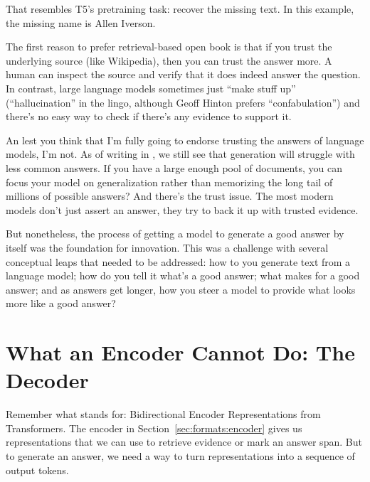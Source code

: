 That resembles T5's pretraining task: recover the missing text.  In this example, the missing name is Allen Iverson.

The first reason to prefer retrieval-based open book  is that if you trust the underlying source (like Wikipedia), then you can trust the answer more.  A human can inspect the source and verify that it does indeed answer the question.  In contrast, large language models sometimes just ``make stuff up'' (``hallucination'' in the lingo, although Geoff Hinton prefers ``confabulation'') and there's no easy way to check if there's any evidence to support it.

An lest you think that I'm fully going to endorse trusting the answers of language models, I'm not.
%
As of writing in \currentyear{}, we still see that generation will struggle with less common answers.  If you have a large enough pool of documents, you can focus your model on generalization rather than memorizing the long tail of millions of possible answers?
%
And there's the trust issue.  
%
The most modern models don't just assert an answer, they try to back it up with trusted evidence.



But nonetheless, the process of getting a model to generate a good answer by itself was the foundation for  innovation.
%
This was a challenge with several conceptual leaps that needed to be addressed: 
%
how to you generate text from a language model;
%
how do you tell it what's a good answer;
%
what makes for a good answer;
%
and as answers get longer, how you steer a model to provide what looks more like a good answer?

\section{What an Encoder Cannot Do: The Decoder}
\label{sec:methods:decoder}

Remember what  stands for: Bidirectional Encoder Representations from Transformers.  The encoder in Section~\ref{sec:formats:encoder} gives us representations that we can use to retrieve evidence or mark an answer span.  But to generate an answer, we need a way to turn representations into a sequence of output tokens.

